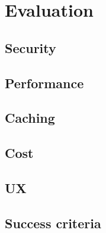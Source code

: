 \chapter{Evaluation}

\section{Security}

\section{Performance}

\section{Caching}

\section{Cost}

\section{UX}

\section{Success criteria}
